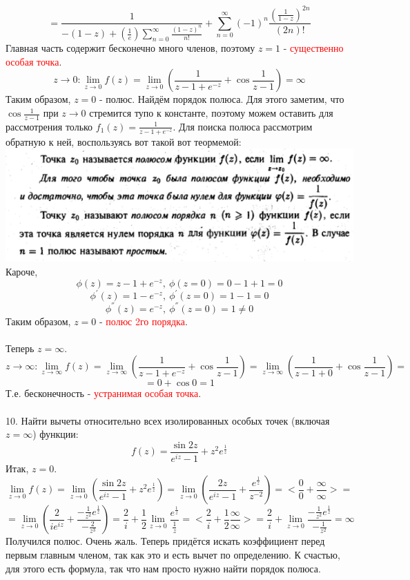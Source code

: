 \documentclass[14pt]{extarticle}
\begin{document}
$$=\frac{1}{-(1-z) + \left(\frac{1}{e}\right)\sum_{n=0}^{\infty}
\frac{(1-z)^n}{n!}}
+ \sum_{n=0}^{\infty}(-1)^n\frac{(\frac{1}{1-z})^{2n}}{(2n)!}$$
Главная часть содержит бесконечно много членов, поэтому $z=1$ -
\textcolor{red}{существенно особая точка}.
$$z\to 0: \lim_{z\to 0}f(z) = \lim_{z\to 0} \left(
\frac{1}{z-1+e^{-z}}+\cos{\frac{1}{z-1}}\right)=\infty$$
Таким образом, $z=0$ - полюс. Найдём порядок полюса. 
Для этого заметим, что $\cos{\frac{1}{z-1}}$ при $z\to 0$ стремится
тупо к константе, поэтому можем оставить для рассмотрения только 
$f_1(z) = \frac{1}{z-1+e^{-z}}$. Для поиска полюса рассмотрим обратную 
к ней, воспользуясь вот такой вот теормемой: \\
\includegraphics[width=500pt]{img8.png} \\
Кароче, 
$$\phi(z) = z-1+e^{-z}, \ \phi(z=0) = 0 - 1 + 1 = 0$$
$$\phi^{'}(z) = 1-e^{-z}, \ \phi^{'}(z=0) = 1 - 1= 0$$
$$\phi^{''}(z) = e^{-z}, \ \phi^{''}(z=0) = 1 \neq 0$$
Таким образом, $z=0$ - \textcolor{red}{полюс 2го порядка}.\\\\
Теперь $z=\infty$.
$$z\to \infty: \lim_{z\to \infty}f(z) = \lim_{z\to \infty} \left(
\frac{1}{z-1+e^{-z}}+\cos{\frac{1}{z-1}}\right)=
\lim_{z\to \infty} \left(
\frac{1}{z-1+0}+\cos{\frac{1}{z-1}}\right)=$$
$$= 0 + \cos 0 = 1$$
Т.е. бесконечность - \textcolor{red}{устранимая особая точка}.\\\\
10. Найти вычеты относительно всех изолированных особых точек
(включая $z=\infty$) функции:
$$f(z)=\frac{\sin2z}{e^{iz}-1}+z^2e^{\frac{1}{z}}$$
Итак, $z=0$.
$$\lim_{z\to 0} f(z) = \lim_{z\to 0} 
\left(\frac{\sin2z}{e^{iz}-1}+z^2e^{\frac{1}{z}}\right)=
\lim_{z\to 0} 
\left(\frac{2z}{e^{iz}-1}+\frac{e^{\frac{1}{z}}}{z^{-2}}\right)=
<\frac{0}{0}+\frac{\infty}{\infty}>=$$
$$=\lim_{z\to 0}\left(\frac{2}{ie^{iz}}
+\frac{-\frac{1}{z^2}e^{\frac{1}{z}}}{-\frac{2}{z^3}}\right)=
\frac{2}{i}+
\frac{1}{2}\lim_{z\to 0}\frac{e^{\frac{1}{z}}}{\frac{1}{z}}
=<\frac{2}{i} + \frac{1}{2}\frac{\infty}{\infty}>=
\frac{2}{i}+
\lim_{z\to 0}\frac{-\frac{1}{z^2}e^{\frac{1}{z}}}{-\frac{1}{z^2}}=\infty$$
Получился полюс. Очень жаль. Теперь придётся искать коэффициент перед
первым главным членом, так как это и есть вычет по определению.
К счастью, для этого есть формула, так что нам просто нужно 
найти порядок полюса. 
\end{document}
